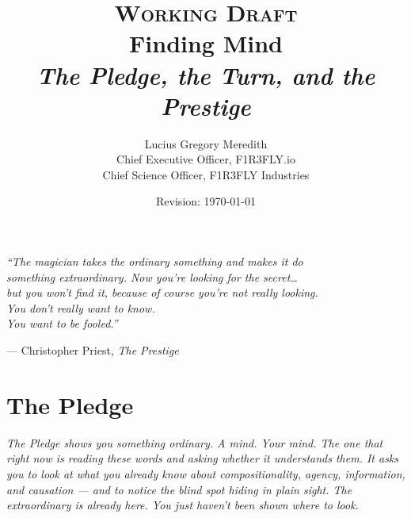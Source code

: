 \documentclass[12pt,openright,twoside]{book}
\title{%
  \vspace{-0.8in}
  {\large\scshape Working Draft}\\[0.6em]
  {\Huge\bfseries Finding Mind}\\[0.5em]
  {\large\itshape The Pledge, the Turn, and the Prestige}
}
\author{%
  Lucius Gregory Meredith\\[0.3em]
  {\small Chief Executive Officer, F1R3FLY.io}\\
  {\small Chief Science Officer, F1R3FLY Industries}
}
\date{Revision: \today}
\theoremstyle{remark}
\theoremstyle{plain}
\theoremstyle{remark}
\theoremstyle{plain}
\theoremstyle{plain}
\begin{document}

\maketitle
\thispagestyle{empty}

\newpage
\thispagestyle{empty}
\vspace*{\fill}
\begin{center}
  \large\itshape
  ``The magician takes the ordinary something and makes it do\\
  something extraordinary. Now you're looking for the secret\ldots{}\\
  but you won't find it, because of course you're not really looking.\\
  You don't really want to know.\\
  You want to be fooled.''
  \medskip

  \normalsize\upshape --- Christopher Priest, \textit{The Prestige}
\end{center}
\vspace*{\fill}
\newpage

\tableofcontents
\newpage

\part{The Pledge}

\vspace{1em}
\begin{mdframed}[backgroundcolor=remarkgray, linecolor=gray!60,
                 linewidth=1pt, topline=false, rightline=false,
                 bottomline=false]
\small\itshape
The Pledge shows you something ordinary.
A mind. Your mind.
The one that right now is reading these words and asking whether it
understands them.
It asks you to look at what you already know about compositionality,
agency, information, and causation --- and to notice the blind spot
hiding in plain sight.
The extraordinary is already here.
You just haven't been shown where to look.
\end{mdframed}
\end{document}

